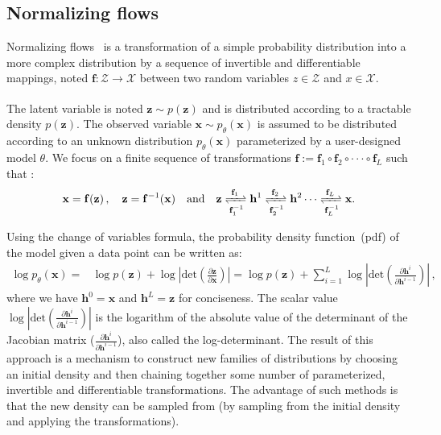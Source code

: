 \documentclass{article} %
\begin{document}
\subsection{Normalizing flows}\label{subsec:nf}
Normalizing flows~\citep{kingma2018glow,rezende2015variational} is a transformation of a simple probability distribution into a more complex distribution by a sequence of invertible and differentiable mappings, noted $\mathbf{f}: \mathcal{Z} \xrightarrow[]{} \mathcal{X}$ between two random variables $z \in \mathcal{Z}$ and $x \in \mathcal{X}$. 

The latent variable is noted $\mathbf{z} \sim p(\mathbf{z})$ and is distributed according to a tractable density $p(\mathbf{z})$. 
The observed variable $\mathbf{x} \sim p_\theta(\mathbf{x})$ is assumed to be distributed according to an unknown distribution $p_\theta(\mathbf{x})$ parameterized by a user-designed model $\theta$. 
We focus on a finite sequence of transformations $\mathbf{f}:=\mathbf{f}_1  \circ \mathbf{f}_2 \circ   \cdot  \cdot \cdot     \circ   \mathbf{f}_L$ such that :
\begin{align*}
\mathbf{x}=\mathbf{f}(\mathbf{z})\, , \quad \mathbf{z}=\mathbf{f}^{-1}(\mathbf{x}) \quad \textrm{and} \quad
    \mathbf{z} \xrightleftharpoons[\mathbf{f}_1^{-1}]{\mathbf{f}_1} \mathbf{h}^1 \xrightleftharpoons[\mathbf{f}_2^{-1}]{\mathbf{f}_2} \mathbf{h}^2 \cdots \xrightleftharpoons[\mathbf{f}_L^{-1}]{\mathbf{f}_L}\mathbf{x}.
\end{align*}

Using the change of variables formula, the probability density function~(pdf) of the model given a data point can be written as: 
\begin{align}\label{eq:flow}
\log p_\theta(\mathbf{x}) =& \log p(\mathbf{z})  + \log | \text{det} ( \frac{\partial \mathbf{z} }{\partial \mathbf{x}} ) | 
=  \log p(\mathbf{z}) + \sum_{i=1}^L\log | \text{det} ( \frac{\partial \mathbf{h}^i } {\partial \mathbf{h}^{i-1}}) | \, ,
\end{align}
where we have $\mathbf{h}^0 = \mathbf{x}$ and $\mathbf{h}^L = \mathbf{z}$ for conciseness. 
The scalar value $\log |\text{det}( \frac{\partial \mathbf{h}^i}{\partial \mathbf{h}^{i-1}})|$ is the logarithm of the absolute value of the determinant of the Jacobian matrix ($\frac{\partial \mathbf{h}^i}{ \partial\mathbf{h}^{i-1}}$), also called the log-determinant. 
The result of this approach is a mechanism to construct new families of distributions by choosing an initial density and then chaining together some number of parameterized, invertible and differentiable transformations. 
The advantage of such methods is that the new density can be sampled from (by sampling from the initial density and applying the transformations).
\end{document}
